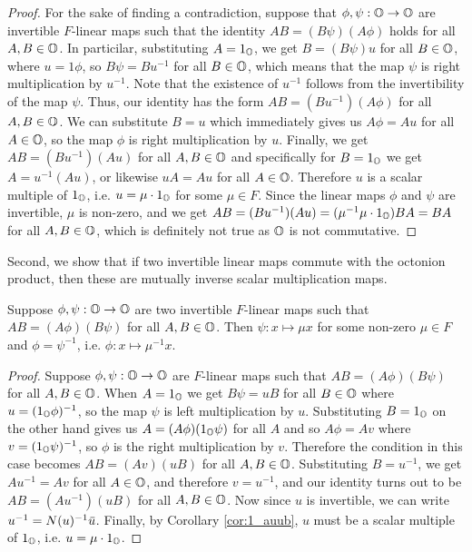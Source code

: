 \begin{proof}
    For the sake of finding a contradiction, suppose that $\phi,\psi : \mathbb{O} \rightarrow \mathbb{O}$ are
    invertible $F$-linear maps such that the identity $AB = (B\psi)(A\phi)$ holds for all \mbox{$A,B\in \mathbb{O}$}.
    In particilar, substituting $A = 1_{\mathbb{O}}$, we get $B = (B\psi) u$ for all $B \in \mathbb{O}$, where $u = 1 \phi$,
    so $B \psi = B u^{-1}$ for all $B \in \mathbb{O}$, which means that the map $\psi$ is right
    multiplication by $u^{-1}$. Note that the existence of $u^{-1}$ follows from the
    invertibility of the map $\psi$. Thus, our identity has the form $AB = (B u^{-1}) (A\phi)$
    for all $A,B \in \mathbb{O}$. We can substitute $B = u$ which immediately gives us $A\phi = Au$ for
    all $A \in \mathbb{O}$, so the map $\phi$ is right multiplication by $u$. Finally, we get
    $AB = (B u^{-1}) (A u)$ for all $A,B \in \mathbb{O}$ and specifically for $B = 1_{\mathbb{O}}$ we get
    $A = u^{-1} (A u)$, or likewise $u A = A u$ for all $A \in \mathbb{O}$. Therefore $u$ is a
    scalar multiple of $1_{\mathbb{O}}$, i.e. $u = \mu \cdot 1_{\mathbb{O}}$ for some $\mu \in F$.
    Since the linear maps $\phi$ and $\psi$ are invertible, $\mu$ is non-zero, and we get
    $AB = (Bu^{-1})(Au) = (\mu^{-1} \mu \cdot 1_{\mathbb{O}}) BA = BA$ for all $A,B \in \mathbb{O}$, which is definitely
    not true as $\mathbb{O}$ is not commutative.
\end{proof}

Second, we show that if two invertible linear maps commute with the octonion product, then
these are mutually inverse scalar multiplication maps.

\begin{lemma}
    \label{lemma:1_white_phipsi2}
    Suppose $\phi,\psi: \mathbb{O} \rightarrow \mathbb{O}$ are two invertible $F$-linear maps such that
    \mbox{$AB = (A\phi) (B\psi)$} for all $A,B \in \mathbb{O}$. Then $\psi : x \mapsto \mu x$
    for some non-zero $\mu \in F$ and $\phi = \psi^{-1}$, i.e. $\phi : x \mapsto \mu^{-1} x$.
\end{lemma}

\begin{proof}
    Suppose $\phi, \psi: \mathbb{O} \rightarrow \mathbb{O}$ are $F$-linear maps such that
    $AB = (A\phi) (B\psi)$ for all $A,B \in \mathbb{O}$. When $A=1_{\mathbb{O}}$ we get $B\psi = uB$ for all
    $B \in \mathbb{O}$ where $u = (1_{\mathbb{O}}\phi)^{-1}$, so
    the map $\psi$ is left multiplication by $u$.
    Substituting $B = 1_{\mathbb{O}}$ on the other hand gives
    us $A = (A\phi) (1_{\mathbb{O}}\psi)$ for all $A$ and so $A\phi = A v$ where $v =
    (1_{\mathbb{O}}\psi)^{-1}$, so $\phi$ is the right multiplication by $v$.
    Therefore the condition in this case becomes $AB = (Av)(uB)$
    for all $A,B \in \mathbb{O}$. Substituting $B = u^{-1}$, we get $Au^{-1} = Av$ for all
    $A \in \mathbb{O}$, and therefore $v = u^{-1}$, and our identity turns out to be
    $AB = (Au^{-1})(uB)$ for
    all $A,B\in \mathbb{O}$. Now since $u$ is invertible, we can write $u^{-1} = N(u)^{-1} \mathord{\mbox{\hspace*{0pt}}\,\overline{\!u\!\!\;}\!\:}\mbox{\hspace*{0pt}}$.
    Finally, by Corollary \ref{cor:1_auub}, $u$ must be a scalar multiple of $1_{\mathbb{O}}$,
    i.e. $u = \mu \cdot 1_{\mathbb{O}}$.
\end{proof}

